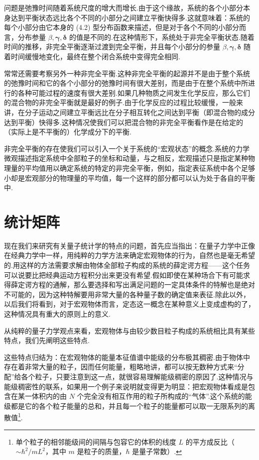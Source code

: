 问题是弛豫时间随着系统尺度的增大而增长.由于这个缘故，系统的各个小部分本身达到平衡状态远比各个不同的小部分之间建立平衡快得多.这就意味着：系统的每个小部分由它本身的 (4.2) 型分布函数来描述，但是对于各个不同的小部分而言，分布参量 $\beta,\boldsymbol{\gamma},\boldsymbol{\delta}$ 的值是不同的.在这种情形下，系统处于非完全平衡状态.随着时间的推移，非完全平衡逐渐过渡到完全平衡，并且每个小部分的参量 $\beta,\boldsymbol{\gamma},\boldsymbol{\delta}$ 随着时间缓慢地变化，最终在整个闭合系统中变得完全相同.

常常还需要考察另外一种非完全平衡.这种非完全平衡的起源并不是由于整个系统的弛豫时间和它的各个小部分的弛豫时间有很大差别，而是由于在整个系统中所进行的各种可能过程的速度有很大差别.如果几种物质之间发生化学反应，那么它们的混合物的非完全平衡就是最好的例子.由于化学反应的过程比较缓慢，一般来讲，在分子运动之间建立平衡远比在分子相互转化之间达到平衡（即混合物的成分达到平衡）快得多.这种情况使我们可以把混合物的非完全平衡看作是在给定的（实际上是不平衡的）化学成分下的平衡.

非完全平衡的存在使我们可以引入一个关于系统的“宏观状态”的概念.系统的力学微观描述指定系统中全部粒子的坐标和动量，与之相反，宏观描述只是指定某种物理量的平均值用以确定系统的特定的非完全平衡，例如，指定表征系统中各个足够小却是宏观部分的物理量的平均值，每一个这样的部分都可以认为处于各自的平衡中.

\section{统计矩阵}

现在我们来研究有关量子统计学的特点的问题，首先应当指出：在量子力学中正像在经典力学中一样，用纯粹的力学方法来确定宏观物体的行为，自然也是毫无希望的.用这样的方法需要求解由物体全部粒子构成的系统的薛定谔方程——这个任务可以说要比把经典运动方程积分出来更没有希望.假如即使在某种场合下有可能求得薛定谔方程的通解，那么要选择和写出满足问题的一定具体条件的特解也是绝对不可能的，因为这种特解要用非常大量的各种量子数的确定值来表征.除此以外，以后我们将看到，对于宏观物体而言，定态这一概念在某种意义上变成虚构的了，这种情况具有重大的原则上的意义.

从纯粹的量子力学观点来看，宏观物体与由较少数目粒子构成的系统相比具有某些特点，我们先阐明这些特点.

这些特点归结为：在宏观物体的能量本征值谱中能级的分布极其稠密.由于物体中存在着非常大量的粒子，因而任何能量，粗略地讲，都可以按无数种方式来“分配”给各个粒子，只要注意到这一点，就很容易理解能级稠密的原因了.这种情况与能级稠密性的联系，如果用一个例子来说明就变得更为明显：把宏观物体看成是包含在某一体积内的由 $N$ 个完全没有相互作用的粒子所构成的“气体”.这个系统的能级都是它的各个粒子能量的总和，并且每一个粒子的能量都可以取一无限系列的离散值\footnote{单个粒子的相邻能级间的间隔与包容它的体积的线度 $L$ 的平方成反比（$\sim\hbar^2/mL^2$，其中 $m$ 是粒子的质量，$\hbar$ 是量子常数）.}.


